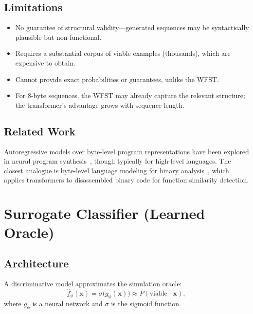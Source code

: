 \documentclass{article}
\begin{document}
\subsection{Limitations}

\begin{itemize}
  \item No guarantee of structural validity---generated sequences may be
        syntactically plausible but non-functional.
  \item Requires a substantial corpus of viable examples (thousands), which
        are expensive to obtain.
  \item Cannot provide exact probabilities or guarantees, unlike the WFST.
  \item For 8-byte sequences, the WFST may already capture the relevant
        structure; the transformer's advantage grows with sequence length.
\end{itemize}

\subsection{Related Work}

Autoregressive models over byte-level program representations have been
explored in neural program synthesis~\cite{chen2021codex}, though typically
for high-level languages.  The closest analogue is byte-level language
modeling for binary analysis~\cite{pei2020trex}, which applies transformers
to disassembled binary code for function similarity detection.


\section{Surrogate Classifier (Learned Oracle)}
\label{sec:classifier}

\subsection{Architecture}

A discriminative model approximates the simulation oracle:
\begin{equation}
  \hat{f}_\phi(\mathbf{x}) = \sigma\bigl(g_\phi(\mathbf{x})\bigr)
  \approx P(\text{viable} \mid \mathbf{x}),
\end{equation}
where $g_\phi$ is a neural network and $\sigma$ is the sigmoid function.
\end{document}
